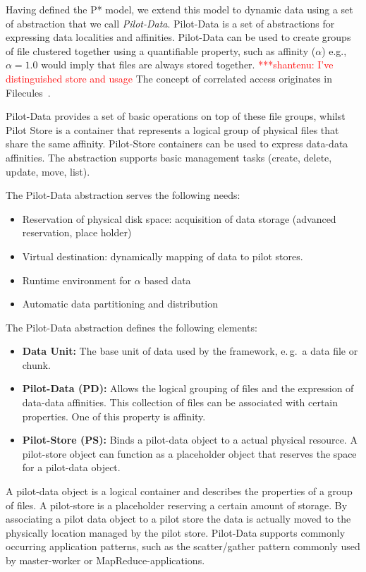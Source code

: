 \documentclass[conference,final]{IEEEtran}
\newcommand{\jhanote}[1]{ {\textcolor{red} { ***shantenu: #1 }}}
\newcommand{\jhanote}[1]{}
\begin{document}
Having defined the P* model, we extend this model to dynamic data using a set of 
abstraction that we call \emph{Pilot-Data}. Pilot-Data is a set of abstractions 
for expressing data localities and affinities. Pilot-Data can be used to create 
groups of file clustered together using a quantifiable property, such as 
affinity ($\alpha$) e.g., $\alpha = 1.0$ would imply that files are always 
stored together. \jhanote{I've distinguished store and usage} The concept of
correlated access originates in 
Filecules~\cite{Doraimani:2008:FGS:1383422.1383429}.


Pilot-Data provides a set of basic operations on top of these file
groups, whilst Pilot Store is a container that represents a logical
group of physical files that share the same affinity. Pilot-Store 
containers can be used to express data-data affinities. The abstraction 
supports basic management tasks (create, delete, update,
move, list). 

The Pilot-Data abstraction serves the following needs:
\begin{itemize}
	\item Reservation of physical disk space: acquisition of data storage (advanced reservation, place holder)
	\item Virtual destination: dynamically mapping of data to pilot stores.
	\item Runtime environment for $\alpha$ based data
	\item Automatic data partitioning and distribution
\end{itemize}


The Pilot-Data abstraction defines the following elements:
\begin{itemize}
    \item \textbf{Data Unit:} The base unit of data used by the framework, e.\,g.\ a data 
    file or chunk.
    \item \textbf{Pilot-Data (PD):} Allows the logical grouping of files and the 
expression of data-data affinities. This collection of files can be associated with certain properties. One of this property is affinity.    
    \item \textbf{Pilot-Store (PS):} Binds a pilot-data object to a actual physical resource. A pilot-store object can function as a placeholder object that reserves the space for a pilot-data object.
\end{itemize}

A pilot-data object is a logical container and describes the properties of a 
group of files. A pilot-store is a placeholder reserving a certain amount of 
storage. By associating a pilot data object to a pilot store the data is 
actually moved to the physically location managed by the pilot store.
Pilot-Data supports commonly occurring application patterns, such as the 
scatter/gather pattern commonly used by  master-worker or 
MapReduce-applications.
\end{document}
